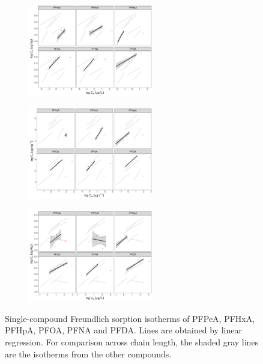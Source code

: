 \begin{figure}
    \centering
        \begin{subfigure}[]{\linewidth}
            \centering
            \includegraphics[width=0.6\textwidth]{R/figs/ULS_facet_isotherm.pdf}
            \label{fig:ULS_isotherm}
        \end{subfigure}
        \begin{subfigure}[]{\linewidth}
            \centering
            \includegraphics[width=0.6\textwidth]{R/figs/DSL_facet_isotherm.pdf}
            \label{fig:DSL_isotherm}
        \end{subfigure}   
\end{figure}
\begin{figure}[t]\ContinuedFloat
        \begin{subfigure}[]{\linewidth}
            \centering
            \includegraphics[width=0.6\textwidth]{R/figs/CWC_facet_isotherm.pdf}
            \label{fig:CWC_isotherm}
        \end{subfigure}
        \caption{Single-compound Freundlich sorption isotherms of PFPeA, PFHxA, PFHpA, PFOA, PFNA and PFDA. Lines are obtained by linear regression. For comparison across chain length, the shaded gray lines are the isotherms from the other compounds.}
        \label{fig:sorption_isotherms_all}
\end{figure}

